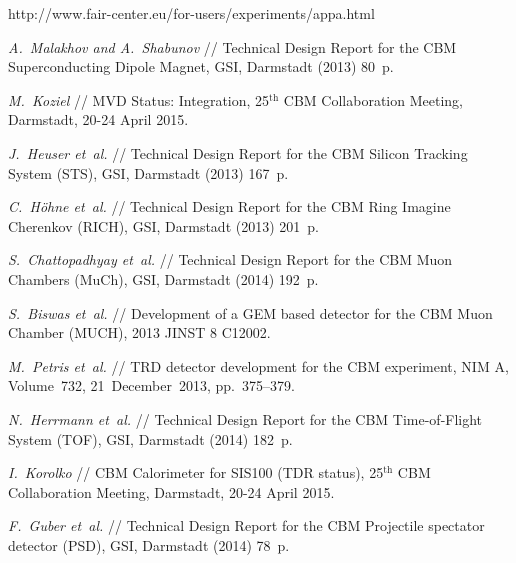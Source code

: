 \begin{thebibliography}{99}
http://www.fair-center.eu/for-users/experiments/appa.html

\textit{A.~Malakhov and A.~Shabunov} // %
Technical Design Report for the CBM Superconducting Dipole Magnet,
GSI, Darmstadt (2013) 80~p.

\textit{M.~Koziel} //
MVD Status: Integration,
25$^\mathrm{th}$ CBM Collaboration Meeting, Darmstadt, 20-24 April 2015.

\textit{J.~Heuser et~al.} //
Technical Design Report for the CBM Silicon Tracking System (STS),
 GSI, Darmstadt (2013) 167~p.

\textit{C.~H\"{o}hne et~al.} //
Technical Design Report for the CBM Ring Imagine Cherenkov (RICH),
GSI, Darmstadt (2013) 201~p.

\textit{S.~Chattopadhyay et~al.} //
Technical Design Report for the CBM Muon Chambers (MuCh),
GSI, Darmstadt (2014) 192~p.

\textit{S.~Biswas et~al.} //
Development of a GEM based detector for the CBM Muon Chamber (MUCH),
2013 JINST 8 C12002.

\textit{M.~Petris et~al.} //
TRD detector development for the CBM experiment,
NIM A, Volume~732, 21~December~2013, pp.~375--379.

\textit{N.~Herrmann et~al.} //
Technical Design Report for the CBM Time-of-Flight System (TOF),
GSI, Darmstadt (2014) 182~p.

\textit{I.~Korolko} //
CBM Calorimeter for SIS100 (TDR status),
25$^\mathrm{th}$ CBM Collaboration Meeting, Darmstadt, 20-24 April 2015.\\

\textit{F.~Guber et~al.} //
Technical Design Report for the CBM Projectile spectator detector (PSD),
GSI, Darmstadt (2014) 78~p.

 \\



\end{thebibliography}
